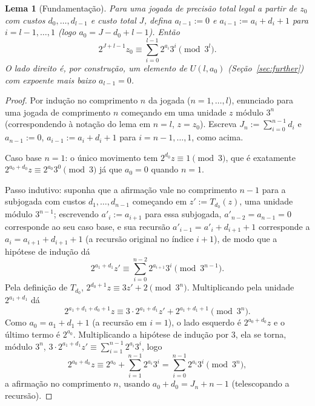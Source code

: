 \documentclass[11pt]{amsart}
\theoremstyle{plain}
\newtheorem{lemma}[theorem]{Lema}
\theoremstyle{definition}
\theoremstyle{remark}
\begin{document}
\begin{lemma}[Fundamentação]
\label{lem:ground}
Para uma jogada de precisão total legal a partir de $z_0$ com custos $d_0,\dots,d_{l-1}$ e custo
total $J$, defina $a_{l-1}:=0$ e $a_{i-1}:=a_i+d_i+1$ para $i=l-1,\dots,1$ (logo
$a_0=J-d_0+l-1$). Então
\[
2^{J+l-1}z_0 \equiv \sum_{i=0}^{l-1} 2^{a_i}3^i \pmod{3^l}.
\]
O lado direito é, por construção, um elemento de $U(l,a_0)$ (Seção~\ref{sec:further}) com expoente
mais baixo $a_{l-1}=0$.
\end{lemma}

\begin{proof}
Por indução no comprimento $n$ da jogada ($n=1,\dots,l$), enunciado para uma jogada de comprimento
$n$ começando em uma unidade $z$ módulo $3^n$ (correspondendo à notação do lema em $n=l$,
$z=z_0$). Escreva $J_n:=\sum_{i=0}^{n-1}d_i$ e $a_{n-1}:=0$, $a_{i-1}:=a_i+d_i+1$ para
$i=n-1,\dots,1$, como acima.

Caso base $n=1$: o único movimento tem $2^{d_0}z\equiv1\pmod3$, que é exatamente
$2^{a_0+d_0}z\equiv2^{a_0}3^0\pmod3$ já que $a_0=0$ quando $n=1$.

Passo indutivo: suponha que a afirmação vale no comprimento $n-1$ para a subjogada com custos
$d_1,\dots,d_{n-1}$ começando em $z':=T_{d_0}(z)$, uma unidade módulo $3^{n-1}$; escrevendo
$a'_i:=a_{i+1}$ para essa subjogada, $a'_{n-2}=a_{n-1}=0$ corresponde ao seu caso base, e sua
recursão $a'_{i-1}=a'_i+d_{i+1}+1$ corresponde a $a_i=a_{i+1}+d_{i+1}+1$ (a recursão original no
índice $i+1$), de modo que a hipótese de indução dá
\[
2^{a_1+d_1}z' \equiv \sum_{i=0}^{n-2}2^{a_{i+1}}3^i \pmod{3^{n-1}}.
\]
Pela definição de $T_{d_0}$, $2^{d_0+1}z\equiv3z'+2\pmod{3^n}$. Multiplicando pela unidade
$2^{a_1+d_1}$ dá
\[
2^{a_1+d_1+d_0+1}z \equiv 3\cdot2^{a_1+d_1}z' + 2^{a_1+d_1+1} \pmod{3^n}.
\]
Como $a_0=a_1+d_1+1$ (a recursão em $i=1$), o lado esquerdo é $2^{a_0+d_0}z$ e o último termo é
$2^{a_0}$. Multiplicando a hipótese de indução por $3$, ela se torna, módulo $3^n$,
$3\cdot2^{a_1+d_1}z'\equiv\sum_{i=1}^{n-1}2^{a_i}3^i$, logo
\[
2^{a_0+d_0}z \equiv 2^{a_0} + \sum_{i=1}^{n-1}2^{a_i}3^i = \sum_{i=0}^{n-1}2^{a_i}3^i \pmod{3^n},
\]
a afirmação no comprimento $n$, usando $a_0+d_0=J_n+n-1$ (telescopando a recursão).
\end{proof}
\end{document}
